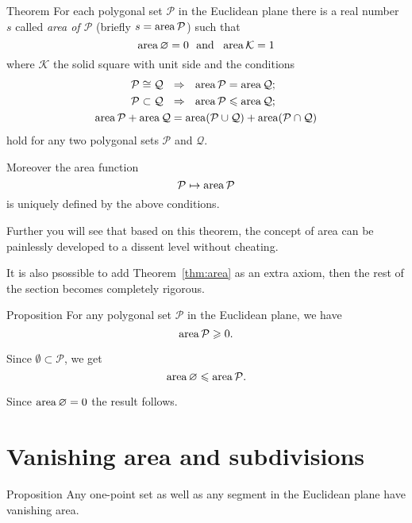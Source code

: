\begin{thm}{Theorem}\label{thm:area}
For each polygonal set $\mathcal{P}$ in the Euclidean plane 
there is a real number $s$ 
called \emph{area of $\mathcal{P}$} 
(briefly $s=\mathop{\rm area}\nolimits \mathcal{P}$) such that 
\[\area\emptyset=0\ \ \text{and}\ \ \area\mathcal{K}=1\]
where  $\mathcal{K}$ the solid square with unit side
and the conditions
\begin{align*}
\mathcal{P}\cong\mathcal{Q}\ \ &\Rightarrow\ \ \area\mathcal{P}=\area\mathcal{Q};
\\
\mathcal{P}\subset\mathcal{Q}\ \ &\Rightarrow\ \ \area\mathcal{P}\le\area\mathcal{Q};
\\
\area\mathcal{P}+\area\mathcal{Q}
&=
\area(\mathcal{P}\cup\mathcal{Q})+\area(\mathcal{P}\cap\mathcal{Q})
\end{align*}
hold 
for any two polygonal sets $\mathcal{P}$ and $\mathcal{Q}$.

Moreover the area function 
\[\mathcal{P}\mapsto \mathop{\rm area}\nolimits \mathcal{P}\]
is uniquely defined by the above conditions.
\end{thm}

Further you will see
that
based on this theorem, 
the concept of area 
can be painlessly developed to a dissent level 
without cheating.

It is also psossible to add Theorem~\ref{thm:area} as an extra axiom,
then the rest of the section becomes completely rigorous.




\begin{thm}{Proposition}\label{prop:area-positive}
For any polygonal set $\mathcal{P}$ in the Euclidean plane, 
we have
\[\mathop{\rm area}\nolimits\mathcal{P}\geqslant 0.\]

\end{thm}

Since $\emptyset \subset \mathcal{P}$,
we get
\[\mathop{\rm area}\nolimits\varnothing\leqslant \mathop{\rm area}\nolimits\mathcal{P}.\]

Since $\mathop{\rm area}\nolimits\varnothing=0$ the result follows.\qeds



\section*{Vanishing area and subdivisions}

\begin{thm}{Proposition}\label{prop:area-segment}
Any one-point set as well as any segment in the Euclidean plane have  vanishing area.
\end{thm}

